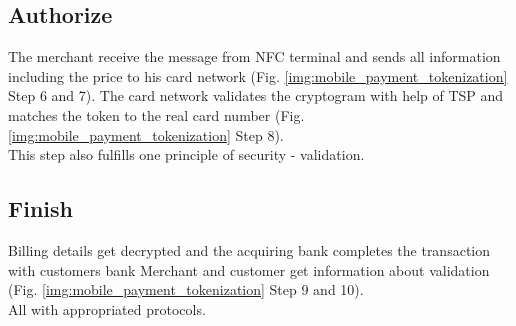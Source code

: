 \subsection{Authorize}
\label{chp:example:sec:applePay:ssec:authorize}

The merchant receive the message from NFC terminal and sends all information including the price to his card network (Fig. \ref{img:mobile_payment_tokenization} Step 6 and 7). The card network validates the cryptogram with help of TSP and matches the token to the real card number (Fig. \ref{img:mobile_payment_tokenization} Step 8).
\\
This step also fulfills one principle of security - validation.

\subsection{Finish}
\label{chp:example:sec:applePay:ssec:finish}

Billing details get decrypted and the acquiring bank completes the transaction with customers bank Merchant and customer get information about validation (Fig. \ref{img:mobile_payment_tokenization} Step 9 and 10).\\ All with appropriated protocols. 
  
